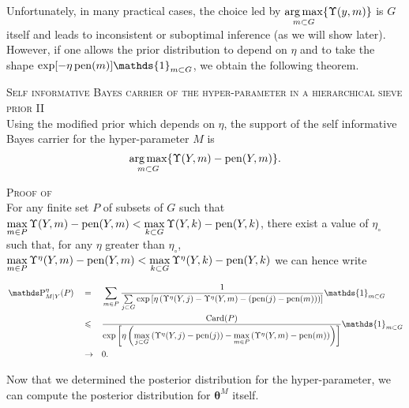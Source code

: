 Unfortunately, in many practical cases, the choice led by $\operatorname*{arg\,max}\limits_{m \subset G} \{\Upsilon(y, m)\}$ is $G$ itself and leads to inconsistent or suboptimal inference (as we will show later).
However, if one allows the prior distribution to depend on $\eta$ and to take the shape $\exp[- \eta \pen(m)] \mathds{1}_{m \subset G}$, we obtain the following theorem.

\begin{thm}{\textsc{Self informative Bayes carrier of the hyper-parameter in a hierarchical sieve prior II}\\}\label{THM_BAYES_HIERARCHICAL_LIMITTHRESHOLD}
Using the modified prior which depends on $\eta$, the support of the self informative Bayes carrier for the hyper-parameter $M$ is
\[\operatorname*{arg\,max}\limits_{m \subset G} \{\Upsilon(Y, m) - \operatorname{pen}(Y, m)\}.\]
\end{thm}

\begin{pro}{\textsc{Proof of }\\}\label{PRO_BAYES_HIERARCHICAL_THRESHOLD}
For any finite set $P$ of subsets of $G$ such that $\max\limits_{m \in P} \Upsilon(Y, m) - \operatorname{pen}(Y, m) < \max\limits_{k \subset G} \Upsilon(Y, k) - \operatorname{pen}(Y, k)$, there exist a value of $\eta_{\circ}$ such that, for any $\eta$ greater than $\eta_{\circ}$, $\max\limits_{m \in P} \Upsilon^{\eta}(Y, m) - \operatorname{pen}(Y, m) < \max\limits_{k \subset G} \Upsilon^{\eta}(Y, k) - \operatorname{pen}(Y, k)$ we can hence write

\begin{alignat*}{3}
& \P_{M\vert Y}^{\eta}(P) && = && \sum\limits_{m \in P} \frac{1}{\sum\limits_{j \subset G}\exp\left[\eta \left(\Upsilon^{\eta}(Y, j) - \Upsilon^{\eta}(Y, m) - \left(\pen(j) - \pen(m)\right)\right)\right]} \mathds{1}_{m \subset G}\\
& && \leq && \frac{\Card(P)}{\exp\left[\eta \left(\max\limits_{j \subset G}\left(\Upsilon^{\eta}(Y, j) - \pen(j)\right) - \max\limits_{m \in P}\left(\Upsilon^{\eta}(Y, m) - \pen(m)\right)\right)\right]} \mathds{1}_{m \subset G}\\
& && \rightarrow && 0.
\end{alignat*}
\qedsymbol
\end{pro}

Now that we determined the posterior distribution for the hyper-parameter, we can compute the posterior distribution for $\boldsymbol{\theta}^{M}$ itself.

